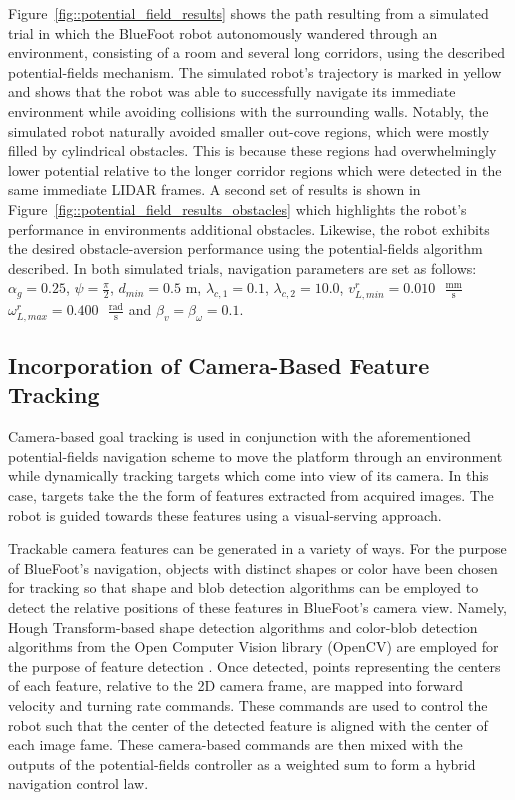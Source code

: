 			Figure~\ref{fig::potential_field_results} shows the path resulting from a simulated trial in which the BlueFoot robot autonomously wandered through an environment, consisting of a room and several long corridors, using the described potential-fields mechanism. The simulated robot's trajectory is marked in yellow and shows that the robot was able to successfully navigate its immediate environment while avoiding collisions with the surrounding walls. Notably, the simulated robot naturally avoided smaller out-cove regions, which were mostly filled by cylindrical obstacles. This is because these regions had overwhelmingly lower potential relative to the longer corridor regions which were detected in the same immediate LIDAR frames. A second set of results is shown in Figure~\ref{fig::potential_field_results_obstacles} which highlights the robot's performance in environments additional obstacles. Likewise, the robot exhibits the desired obstacle-aversion performance using the potential-fields algorithm described. In both simulated trials, navigation parameters are set as follows: 
				$\alpha_{g}=0.25$,
				$\psi=\frac{\pi}{2}$,
				$d_{min}=0.5\text{ m}$,
				$\lambda_{c,1}=0.1$,
				$\lambda_{c,2}=10.0$, 
				$v_{L,min}^{r}=0.010\text{ }\frac{\text{mm}}{\text{s}}$
				$\omega_{L,max}^{r}=0.400\text{ }\frac{\text{rad}}{\text{s}}$
				and
				$\beta_{v}=\beta_{\omega}=0.1$.


		\subsection{Incorporation of Camera-Based Feature Tracking}
		
			Camera-based goal tracking is used in conjunction with the aforementioned potential-fields navigation scheme to move the platform through an environment while dynamically tracking targets which come into view of its camera. In this case, targets take the the form of features extracted from acquired images. The robot is guided towards these features using a visual-serving approach. 

			Trackable camera features can be generated in a variety of ways. For the purpose of BlueFoot's navigation, objects with distinct shapes or color have been chosen for tracking so that shape and blob detection algorithms can be employed to detect the relative positions of these features in BlueFoot's camera view. Namely, Hough Transform-based shape detection algorithms and color-blob detection algorithms from the Open Computer Vision library (OpenCV) are employed for the purpose of feature detection \cite{opencv_library}. Once detected, points representing the centers of each feature, relative to the 2D camera frame, are mapped into forward velocity and turning rate commands. These commands are used to control the robot such that the center of the detected feature is aligned with the center of each image fame. These camera-based commands are then mixed with the outputs of the potential-fields controller as a weighted sum to form a hybrid navigation control law.


